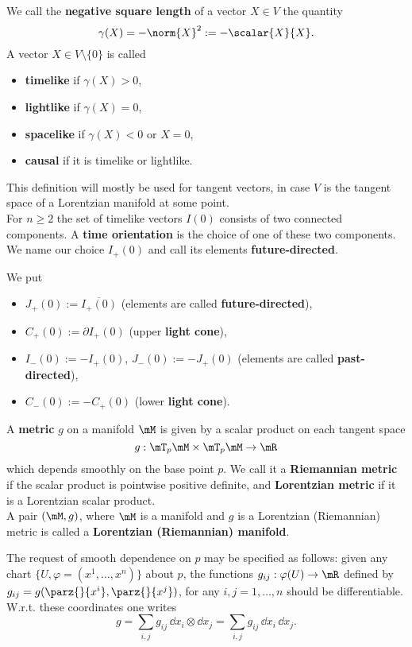 \begin{definition}We call the \textbf{negative square length} of a vector $X\in V$ the quantity
	\[\gamma(X)=-\norm{X}^2:=-\scalar{X}{X}. \]
	A vector $X\in V\setminus\{0\}$ is called
\begin{itemize}
	\item  \textbf{timelike} if $\gamma(X)>0$,
	\item \textbf{lightlike} if $\gamma(X)=0$,
	\item \textbf{spacelike} if $\gamma(X)<0$ or $X=0$,
	\item \textbf{causal} if it is timelike or lightlike.
	\end{itemize}
	\end{definition}
	This definition will mostly be used for tangent vectors, in case $V$ is the tangent space of a Lorentzian manifold at some point.\\
	

	
	
	For $n\geq 2$ the set of timelike vectors $I(0)$ consists of two connected components. A \textbf{time orientation} is the choice of one of these two components. We name our choice $I_+(0)$ and call its elements \textbf{future-directed}.\\

	\begin{definition}	We put
	\begin{itemize}
		\item $J_+(0):=\overline{I_+(0)}$ (elements are called \textbf{future-directed}),
		\item $C_+(0):=\partial I_+(0)$ (upper \textbf{light cone}),
		\item $I_-(0):=-I_+(0)$, $J_-(0):=-J_+(0)$ (elements are called \textbf{past-directed}),
		\item $C_-(0):=-C_+(0)$ (lower \textbf{light cone}).
	\end{itemize}
	\end{definition}

	


\begin{definition}
	A \textbf{metric} $g$ on a manifold $\mM$ is given by a scalar product on each tangent space $$g:\mT_p\mM\times\mT_p\mM\to\mR$$ which depends smoothly on the base point $p$. We call it a \textbf{Riemannian metric} if the scalar product is pointwise positive definite, and \textbf{Lorentzian metric} if it is a Lorentzian scalar product.\\
	A pair $(\mM,g)$, where $\mM$ is a manifold and $g$ is a Lorentzian (Riemannian) metric is called a \textbf{Lorentzian (Riemannian) manifold}.
\end{definition}
The request of smooth dependence on $p$ may be specified as follows: given any chart $\{U,\varphi=(x^1,\dots,x^n)\}$ about $p$, the functions $g_{ij}:\varphi(U)\to\mR$ defined by $g_{ij}=g(\parz{ }{x^i},\parz{ }{x^j})$, for any $i,j=1,\dots,n$ should be differentiable. W.r.t. these coordinates one writes
\[ g=\sum_{i,j} g_{ij}\,\dd x_i\otimes \dd x_j=\sum_{i,j}g_{ij}\,\dd x_i\, \dd x_j. \]

